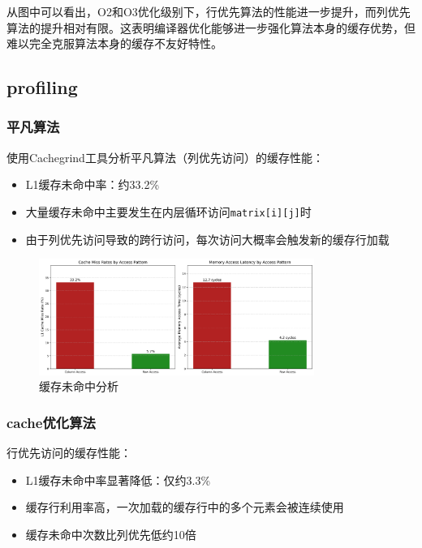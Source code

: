\documentclass[a4paper,colorlinks=true,linkcolor=blue,urlcolor=blue,citecolor=green,bookmarks=true]{article}
\begin{document}
从图中可以看出，O2和O3优化级别下，行优先算法的性能进一步提升，而列优先算法的提升相对有限。这表明编译器优化能够进一步强化算法本身的缓存优势，但难以完全克服算法本身的缓存不友好特性。

\subsection{profiling}

\subsubsection{平凡算法}

使用Cachegrind工具分析平凡算法（列优先访问）的缓存性能：

\begin{itemize}
  \item L1缓存未命中率：约33.2\%
  \item 大量缓存未命中主要发生在内层循环访问\verb|matrix[i][j]|时
  \item 由于列优先访问导致的跨行访问，每次访问大概率会触发新的缓存行加载
\end{itemize}

\begin{figure}[htbp]
  \centering
  \includegraphics[width=0.8\textwidth]{cache_miss_analysis.png}
  \caption{缓存未命中分析}
  \label{fig:cache_performance}
\end{figure}

\subsubsection{cache优化算法}

行优先访问的缓存性能：

\begin{itemize}
  \item L1缓存未命中率显著降低：仅约3.3\%
  \item 缓存行利用率高，一次加载的缓存行中的多个元素会被连续使用
  \item 缓存未命中次数比列优先低约10倍
\end{itemize}
\end{document}
